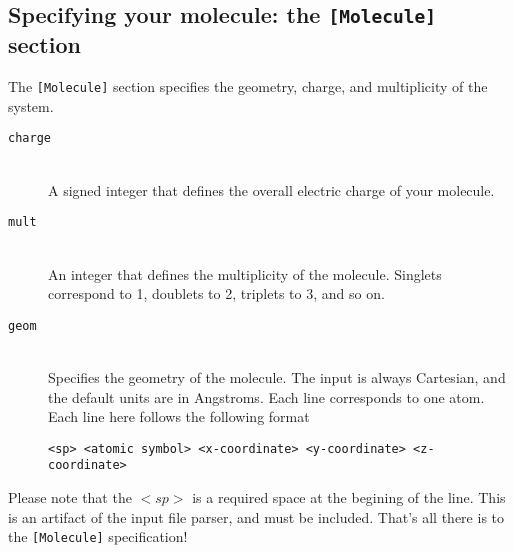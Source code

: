 \documentclass[12pt]{article}
\begin{document}
    \subsection{Specifying your molecule: the \texttt{[Molecule]} section} \label{subsec:MoleculeInput}
    The \texttt{[Molecule]} section specifies the geometry, charge, and multiplicity of the system. 
    \begin{description}
    \item[\texttt{charge}] \hfill \\
    A signed integer that defines the overall electric charge of your molecule.
    \item[\texttt{mult}] \hfill \\
    An integer that defines the multiplicity of the molecule. Singlets correspond to 1, doublets to 2, triplets to 3, and so on.
    \item[\texttt{geom}] \hfill \\
    Specifies the geometry of the molecule. The input is always Cartesian, and the default units are in Angstroms. Each line corresponds to one atom. Each line here follows the following format
          \begin{lstlisting}
<sp> <atomic symbol> <x-coordinate> <y-coordinate> <z-coordinate>
          \end{lstlisting} 
    \end{description}
    Please note that the $<sp>$ is a required space at the begining of the line. This is an artifact of the input file parser, and must be included. That's all there is to the \texttt{[Molecule]} specification!
\end{document}
